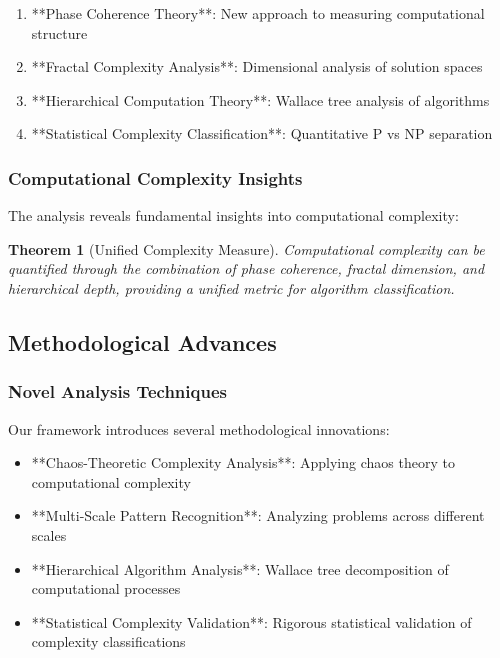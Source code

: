 \documentclass[12pt]{article}
\newtheorem{theorem}{Theorem}
\begin{document}
\begin{enumerate}
    \item **Phase Coherence Theory**: New approach to measuring computational structure
    \item **Fractal Complexity Analysis**: Dimensional analysis of solution spaces
    \item **Hierarchical Computation Theory**: Wallace tree analysis of algorithms
    \item **Statistical Complexity Classification**: Quantitative P vs NP separation
\end{enumerate}

\subsubsection{Computational Complexity Insights}

The analysis reveals fundamental insights into computational complexity:

\begin{theorem}[Unified Complexity Measure]
Computational complexity can be quantified through the combination of phase coherence, fractal dimension, and hierarchical depth, providing a unified metric for algorithm classification.
\end{theorem}

\subsection{Methodological Advances}

\subsubsection{Novel Analysis Techniques}

Our framework introduces several methodological innovations:

\begin{itemize}
    \item **Chaos-Theoretic Complexity Analysis**: Applying chaos theory to computational complexity
    \item **Multi-Scale Pattern Recognition**: Analyzing problems across different scales
    \item **Hierarchical Algorithm Analysis**: Wallace tree decomposition of computational processes
    \item **Statistical Complexity Validation**: Rigorous statistical validation of complexity classifications
\end{itemize}
\end{document}
